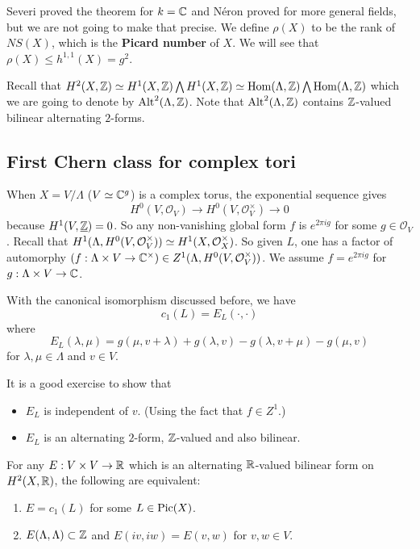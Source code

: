 Severi proved the theorem for $k={\mathbb C}$ and N\'{e}ron proved for more general fields, but we are not going to make that precise. We define $\rho(X)$ to be the rank of $NS(X)$, which is the \textbf{Picard number} of $X$. We will see that $\rho(X)\leq h^{1,1}(X)=g^2$. 

Recall that $H^2(X,{\mathbb Z})\simeq H^1(X,{\mathbb Z})\bigwedge H^1(X,{\mathbb Z})\simeq \operatorname{Hom}(\Lambda,{\mathbb Z})\bigwedge \operatorname{Hom}(\Lambda,{\mathbb Z})$ which we are going to denote by $\text{Alt}^2(\Lambda,{\mathbb Z})$. Note that $\text{Alt}^2(\Lambda,{\mathbb Z})$ contains ${\mathbb Z}$-valued bilinear alternating $2$-forms. 

\subsection{First Chern class for complex tori}
When $X=V/\Lambda$ ($V\simeq {\mathbb C}^g$) is a complex torus, the exponential sequence gives 
$$H^0(V,\mathcal{O}_V)\to H^0(V,\mathcal{O}_V^\times)\to 0$$
because $H^1(V,\underline{{\mathbb Z}})=0$. So any non-vanishing global form $f$ is $e^{2\pi i g} $ for some $g\in \mathcal{O}_V$. Recall that $H^1(\Lambda,H^0(V,\mathcal{O}_V^\times))\simeq H^1(X,\mathcal{O}_X^\times)$. So given $L$, one has a factor of automorphy $(f:\Lambda\times V\to {\mathbb C}^\times)\in Z^1(\Lambda,H^0(V,\mathcal{O}_V^\times))$. We assume $f=e^{2\pi i g}$ for $g:\Lambda \times V\to {\mathbb C}$. 

\begin{theorem}
With the canonical isomorphism discussed before, we have 
$$c_1(L)=E_L(\cdot,\cdot)$$
where
$$E_L(\lambda,\mu)=g(\mu,v+\lambda)+g(\lambda,v)-g(\lambda,v+\mu)-g(\mu, v)$$
for $\lambda,\mu\in \Lambda$ and $v\in V$.
\end{theorem}

It is a good exercise to show that 
\begin{itemize}
\item $E_L$ is independent of $v$. (Using the fact that $f\in Z^1$.)
\item $E_L$ is an alternating $2$-form, ${\mathbb Z}$-valued and also bilinear. 
\end{itemize}
 

\begin{theorem}
For any $E:V\times V\to {\mathbb R}$ which is an alternating ${\mathbb R}$-valued bilinear form on $H^2(X,{\mathbb R})$, the following are equivalent:
\begin{enumerate}
\item $E=c_1(L)$ for some $L\in \operatorname{Pic}(X)$.
\item $E(\Lambda,\Lambda)\subset {\mathbb Z}$ and $E(iv,iw)=E(v,w)$ for $v, w \in V$.
\end{enumerate}
\end{theorem}


